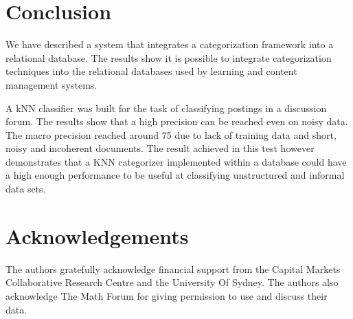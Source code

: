 \documentclass[twocolumn]{article}
\begin{document}
\section{Conclusion}

We have described a system that integrates a categorization framework into a 
relational database. The results show it is possible to integrate categorization 
techniques into the relational databases used by learning and content management 
systems.

A kNN classifier was built for the task of classifying postings in a discussion forum. 
The results show that a high precision can be reached even on  noisy data. The macro 
precision reached around 75%
due to lack of training data and short, noisy and incoherent documents. The result 
achieved in this test however demonstrates that a KNN categorizer implemented 
within a database could have a high enough performance to be useful at classifying 
unstructured and informal data sets. 

\section*{Acknowledgements}

The authors gratefully acknowledge financial support from the Capital Markets 
Collaborative Research Centre and the University Of Sydney. The authors also 
acknowledge The Math Forum for giving permission to use and discuss their data. 



\end{document}
